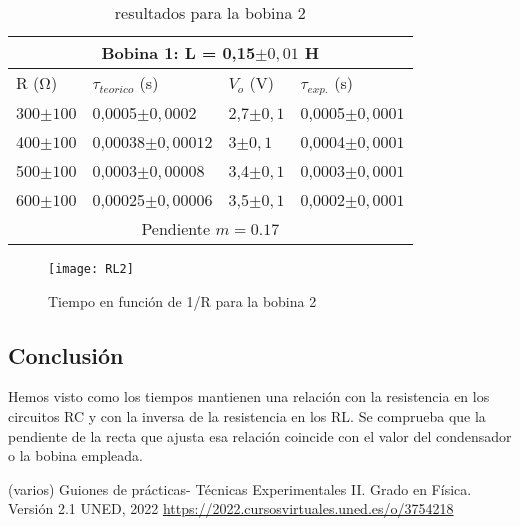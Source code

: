 \documentclass[a4paper,12pt,spanish]{article}
\begin{document}
\begin{table}[H]
	\centering
	\begin{tabular}{|llll|}
		\hline
		\multicolumn{4}{|c|}{Bobina 1: L = 0,15$\pm0,01$ H}                                                                    \\ \hline
\multicolumn{1}{|l|}{R ($\si{\ohm}$)}    & \multicolumn{1}{l|}{$\tau_{teorico}$ (s)} & \multicolumn{1}{l|}{$V_o$ (V)} & $\tau_{exp.}$ (s) \\ \hline
		\multicolumn{1}{|l|}{300$\pm100$} & \multicolumn{1}{l|}{0,0005$\pm0,0002$}      & \multicolumn{1}{l|}{2,7$\pm 0,1$}   & 0,0005$\pm 0,0001$           \\ \hline
		\multicolumn{1}{|l|}{400$\pm100$} & \multicolumn{1}{l|}{0,00038$\pm0,00012$}    & \multicolumn{1}{l|}{3$\pm 0,1$}     & 0,0004$\pm 0,0001$           \\ \hline
		\multicolumn{1}{|l|}{500$\pm100$} & \multicolumn{1}{l|}{0,0003$\pm0,00008$}      & \multicolumn{1}{l|}{3,4$\pm 0,1$}   & 0,0003$\pm 0,0001$           \\ \hline
		\multicolumn{1}{|l|}{600$\pm100$} & \multicolumn{1}{l|}{0,00025$\pm0,00006$}     & \multicolumn{1}{l|}{3,5$\pm 0,1$}   & 0,0002$\pm 0,0001$           \\ \hline
		\multicolumn{4}{|c|}{Pendiente $m = 0.17$}                                                \\ \hline
	\end{tabular}
	\caption{resultados para la bobina 2}
	\label{tab:my-table}
\end{table}





\begin{figure}[H]
	\centering
	\texttt{[image: RL2]}
	\caption{Tiempo en función de 1/R para la bobina 2}
	\label{fig:rl2}
\end{figure}


\subsection*{Conclusión}

Hemos visto como los tiempos mantienen una relación con la resistencia en los circuitos RC y con la inversa de la resistencia en los RL. Se comprueba que la pendiente de la recta que ajusta esa relación coincide con el valor del condensador o la bobina empleada.


\begin{thebibliography}{3}
	
	
	 (varios) Guiones de prácticas- Técnicas Experimentales II. Grado en Física. Versión 2.1  UNED, 2022 \url{https://2022.cursosvirtuales.uned.es/o/3754218}
	
	
\end{thebibliography}
\end{document}

